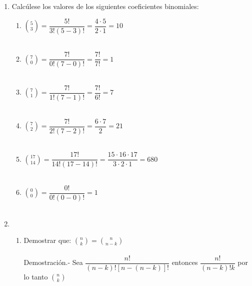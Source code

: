 \begin{enumerate}

\item Calcúlese los valores de los siguientes coeficientes binomiales:
\begin{enumerate}[\bfseries (a)]
\item ${5 \choose 3} = \dfrac{5!}{3!(5-3)!} = \dfrac{4\cdot 5}{2\cdot 1} = 10$\\\\

\item ${ 7 \choose 0 } = \dfrac{7!}{0!(7-0)!} = \dfrac{7!}{7!} = 1$\\\\

\item ${ 7 \choose 1 } = \dfrac{7!}{1!(7-1)!} = \dfrac{7!}{6!} = 7$\\\\

\item ${ 7 \choose 2 } = \dfrac{7!}{2!(7-2)!} = \dfrac{6\cdot 7}{2} = 21$\\\\

\item ${ 17 \choose 14 } = \dfrac{17!}{14!(17-14)!} = \dfrac{15 \cdot 16 \cdot 17}{3\cdot 2 \cdot 1} = 680$\\\\

\item ${ 0 \choose 0 } = \dfrac{0!}{0!(0-0)!} = 1$\\\\
\end{enumerate}

\item 
\begin{enumerate}[\bfseries (a)]
\item Demostrar que: ${n \choose k} = {n \choose n-k}$\\\\
Demostración.- \; Sea $\dfrac{n!}{(n-k)!\left[ n - (n-k) \right]!}$ entonces $\dfrac{n!}{(n-k)!k}$ por lo tanto ${n \choose k}$\\\\


\end{enumerate}
\end{enumerate}
